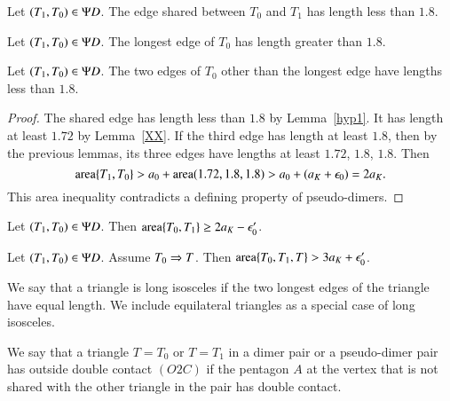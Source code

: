 \begin{lemma}\label{NKQNXUN} \label{calc:pseudo1} 
Let $(T_1,T_0)\in \Psi D$.  The edge shared between
$T_0$ and $T_1$ has length less than $1.8$. 
\end{lemma}

\begin{lemma}\label{RWWHLQT}\label{calc:pseudo2} 
Let $(T_1,T_0)\in \Psi D$.  The longest edge of $T_0$
has length greater than $1.8$.
\end{lemma}

\begin{lemma}\label{calc:pseudo3}  
Let $(T_1,T_0)\in \Psi D$.  The two edges of $T_0$ other than the longest edge have lengths less
than $1.8$.
\end{lemma}

\begin{proof}
The shared edge has length less than $1.8$ by Lemma~\ref{hyp1}.  
It has length at least $1.72$ by Lemma~\ref{XX}.
If the third edge has length at
least $1.8$, then by the previous lemmas, its three edges have lengths at least $1.72$, $1.8$, $1.8$.
Then 
\[
{\operatorname{area}}\{T_1,T_0\} > a_0 + {\operatorname{area}}(1.72,1.8,1.8) > a_0 + (a_K + \epsilon_0) = 2a_K.
\]
This area inequality contradicts a defining property of pseudo-dimers.
\end{proof}

\begin{lemma}\label{BXZBPJW}\label{calc:pseudo-area}
Let $(T_1,T_0)\in\Psi D$.  Then ${\operatorname{area}}\{T_0,T_1\} \ge 2a_K - \epsilon_0'$.
\end{lemma}

\begin{lemma}\label{JQMRXTH}\label{calc:pseudo-area3}
Let $(T_1,T_0)\in\Psi D$. Assume $T_0\Rightarrow T$.  Then ${\operatorname{area}}\{T_0,T_1,T\} > 3a_K + \epsilon_0'$.
\end{lemma}

\begin{definition}
We say that a triangle is long isosceles if the two longest edges of the triangle have
equal length.  We include equilateral triangles as a special case of long isosceles.
\end{definition}

\begin{definition}[O2C]
We say that a triangle $T=T_0$ or $T=T_1$ in a dimer pair or a pseudo-dimer pair has outside double
contact $(O2C)$ if the pentagon $A$ at the vertex that is not shared with the other triangle in the pair
has double contact.
\end{definition}

